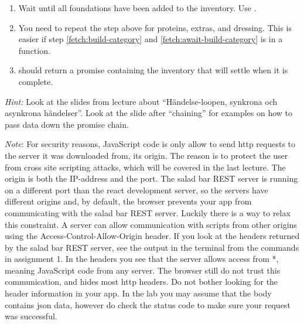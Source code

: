 \documentclass[fleqn, article, a4paper]{memoir}
\begin{document}
\begin{Assignments}
\begin{enumerate}
\item \label{fetch:await-build-category} Wait until all foundations have been added to the inventory. Use .
\item You need to repeat the step above for proteins, extras, and dressing. This is easier if step \ref{fetch:build-category} and \ref{fetch:await-build-category} is in a function.
\item {} should return a promise containing the inventory that will settle when it is complete.
\end{enumerate}
\emph{Hint:} Look at the slides from lecture about ``Händelse-loopen, synkrona och asynkrona händelser''. Look at the slide after ``chaining'' for examples on how to pass data down the promise chain.

\emph{Note}: For security reasons, JavaScript code is only allow to send http requests to the server it was downloaded from, its origin. The reason is to protect the user from cross site scripting attacks, which will be covered in the last lecture. The origin is both the IP-address and the port. The salad bar REST server is running on a different port than the react development server, so the servers have different origins and, by default, the browser prevents your app from communicating with the salad bar REST server. Luckily there is a way to relax this constraint. A server can allow communication with scripts from other origins using the Access-Control-Allow-Origin header. If you look at the headers returned by the salad bar REST server, see the output in the terminal from the  commands in assignment 1. In the headers you see that the server allows access from *, meaning JavaScript code from any server. The browser still do not trust this communication, and hides most http headers. Do not bother looking for the header information in your app. In the lab you may assume that the body contains json data, however do check the status code to make sure your request was successful.


\end{Assignments}
\end{document}
